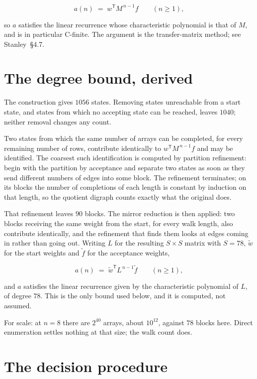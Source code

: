 \documentclass[11pt]{article}
\theoremstyle{definition}
\begin{document}
\[a(n) \;=\; w^{\mathsf T} M^{\,n-1} f \qquad (n \ge 1),\]

so $a$ satisfies the linear recurrence whose characteristic polynomial is that of $M$, and is in particular C-finite. The argument is the transfer-matrix method; see Stanley~\S4.7.

\section{The degree bound, derived}

The construction gives $1056$ states. Removing states unreachable from a start state, and states from which no accepting state can be reached, leaves $1040$; neither removal changes any count.

Two states from which the same number of arrays can be completed, for every remaining number of rows, contribute identically to $w^{\mathsf T}M^{\,n-1}f$ and may be identified. The coarsest such identification is computed by partition refinement: begin with the partition by acceptance and separate two states as soon as they send different numbers of edges into some block. The refinement terminates; on its blocks the number of completions of each length is constant by induction on that length, so the quotient digraph counts exactly what the original does.

That refinement leaves $90$ blocks. The mirror reduction is then applied: two blocks receiving the same weight from the start, for every walk length, also contribute identically, and the refinement that finds them looks at edges coming in rather than going out. Writing $L$ for the resulting $S \times S$ matrix with $S = 78$, $\tilde w$ for the start weights and $\tilde f$ for the acceptance weights,

\[a(n) \;=\; \tilde w^{\mathsf T} L^{\,n-1} \tilde f \qquad (n \ge 1),\]

and $a$ satisfies the linear recurrence given by the characteristic polynomial of $L$, of degree $78$. This is the only bound used below, and it is computed, not assumed.

For scale: at $n = 8$ there are $2^{40}$ arrays, about $10^{12}$, against $78$ blocks here. Direct enumeration settles nothing at that size; the walk count does.

\section{The decision procedure}
\end{document}
